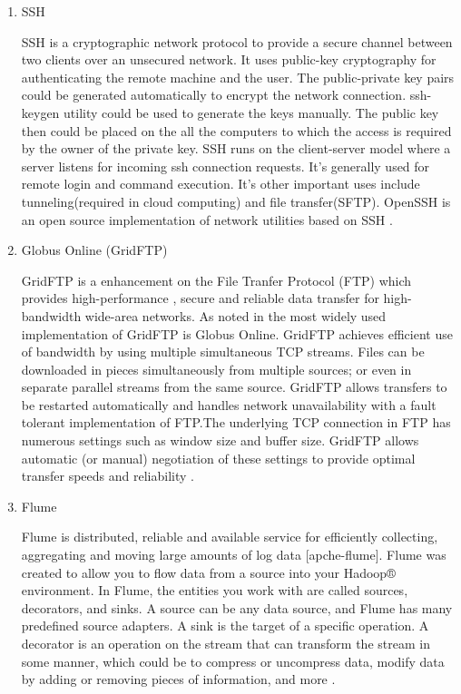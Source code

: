 \begin{enumerate}
\item {} 
SSH

SSH is a cryptographic network protocol \label{\detokenize{i524/technologies:id494}}{\hyperref[\detokenize{i524/technologies:www-ssh-wiki}]{\sphinxcrossref{{[}425{]}}}} to
provide a secure channel between two clients over an unsecured
network. It uses public-key cryptography for authenticating the
remote machine and the user. The public-private key pairs could
be generated automatically to encrypt the network connection.
ssh-keygen utility could be used to generate the keys manually.
The public key then could be placed on the all the computers to
which the access is required by the owner of the private key.
SSH runs on the client-server model where a server listens for
incoming ssh connection requests. It's generally used for remote
login and command execution. It's other important uses include
tunneling(required in cloud computing) and file transfer(SFTP).
OpenSSH is an open source implementation of network utilities
based on SSH \label{\detokenize{i524/technologies:id495}}{\hyperref[\detokenize{i524/technologies:www-openssh-wiki}]{\sphinxcrossref{{[}426{]}}}}.

\item {} 
Globus Online (GridFTP)

GridFTP is a enhancement on the File Tranfer Protocol (FTP) which
provides high-performance , secure and reliable data transfer for
high-bandwidth wide-area networks. As noted in
\label{\detokenize{i524/technologies:id496}}{\hyperref[\detokenize{i524/technologies:www-globusonline}]{\sphinxcrossref{{[}427{]}}}} the most widely used implementation of
GridFTP is Globus Online. GridFTP achieves efficient use of
bandwidth by using multiple simultaneous TCP streams.  Files can
be downloaded in pieces simultaneously from multiple sources; or
even in separate parallel streams from the same source. GridFTP
allows transfers to be restarted automatically and handles
network unavailability with a fault tolerant implementation of
FTP.The underlying TCP connection in FTP has numerous settings
such as window size and buffer size. GridFTP allows automatic (or
manual) negotiation of these settings to provide optimal transfer
speeds and reliability .

\item {} 
Flume

Flume is distributed, reliable and available service for
efficiently collecting, aggregating and moving large amounts of
log data {[}apche-flume{]}. Flume was created to allow you to
flow data from a source into your Hadoop® environment.  In Flume,
the entities you work with are called sources, decorators, and
sinks. A source can be any data source, and Flume has many
predefined source adapters. A sink is the target of a specific
operation. A decorator is an operation on the stream that can
transform the stream in some manner, which could be to compress
or uncompress data, modify data by adding or removing pieces of
information, and more \label{\detokenize{i524/technologies:id498}}{\hyperref[\detokenize{i524/technologies:ibm-flume}]{\sphinxcrossref{{[}428{]}}}}.


\end{enumerate}
